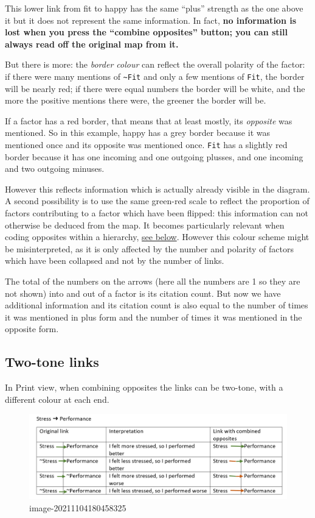 \documentclass[
]{book}
\begin{document}
This lower link from fit to happy has the same ``plus'' strength as the one above it but it does not represent the same information. In fact, \textbf{no information is lost when you press the ``combine opposites'' button; you can still always read off the original map from it.}

But there is more: the \emph{border colour} can reflect the overall polarity of the factor: if there were many mentions of \texttt{\textasciitilde{}Fit} and only a few mentions of \texttt{Fit}, the border will be nearly red; if there were equal numbers the border will be white, and the more the positive mentions there were, the greener the border will be.

If a factor has a red border, that means that at least mostly, its \emph{opposite} was mentioned. So in this example, happy has a grey border because it was mentioned once and its opposite was mentioned once. \texttt{Fit} has a slightly red border because it has one incoming and one outgoing plusses, and one incoming and two outgoing minuses.

However this reflects information which is actually already visible in the diagram. A second possibility is to use the same green-red scale to reflect the proportion of factors contributing to a factor which have been flipped: this information can not otherwise be deduced from the map. It becomes particularly relevant when coding opposites within a hierarchy, \protect\hyperlink{xopposites-coding}{see below}. However this colour scheme might be misinterpreted, as it is only affected by the number and polarity of factors which have been collapsed and not by the number of links.

The total of the numbers on the arrows (here all the numbers are 1 so they are not shown) into and out of a factor is its citation count. But now we have additional information and its citation count is also equal to the number of times it was mentioned in plus form and the number of times it was mentioned in the opposite form.

\hypertarget{two-tone-links}{%
\subsection{Two-tone links}\label{two-tone-links}}

In Print view, when combining opposites the links can be two-tone, with a different colour at each end.

\begin{figure}
\centering
\includegraphics[width=6.77083in,height=\textheight]{_assets/image-20211104180458325.png}
\caption{image-20211104180458325}
\end{figure}
\end{document}

